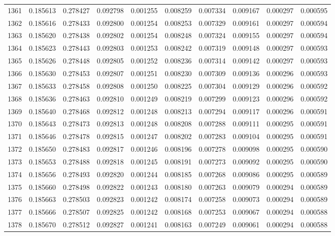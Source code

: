 \begin{tabular}{lrrrrrrrrr}
1361 & 0.185613 & 0.278427 & 0.092798 & 0.001255 & 0.008259 & 0.007334 & 0.009167 & 0.000297 & 0.000595 \\
1362 & 0.185616 & 0.278433 & 0.092800 & 0.001254 & 0.008253 & 0.007329 & 0.009161 & 0.000297 & 0.000594 \\
1363 & 0.185620 & 0.278438 & 0.092802 & 0.001254 & 0.008248 & 0.007324 & 0.009155 & 0.000297 & 0.000594 \\
1364 & 0.185623 & 0.278443 & 0.092803 & 0.001253 & 0.008242 & 0.007319 & 0.009148 & 0.000297 & 0.000593 \\
1365 & 0.185626 & 0.278448 & 0.092805 & 0.001252 & 0.008236 & 0.007314 & 0.009142 & 0.000297 & 0.000593 \\
1366 & 0.185630 & 0.278453 & 0.092807 & 0.001251 & 0.008230 & 0.007309 & 0.009136 & 0.000296 & 0.000593 \\
1367 & 0.185633 & 0.278458 & 0.092808 & 0.001250 & 0.008225 & 0.007304 & 0.009129 & 0.000296 & 0.000592 \\
1368 & 0.185636 & 0.278463 & 0.092810 & 0.001249 & 0.008219 & 0.007299 & 0.009123 & 0.000296 & 0.000592 \\
1369 & 0.185640 & 0.278468 & 0.092812 & 0.001248 & 0.008213 & 0.007294 & 0.009117 & 0.000296 & 0.000591 \\
1370 & 0.185643 & 0.278473 & 0.092813 & 0.001248 & 0.008208 & 0.007288 & 0.009111 & 0.000295 & 0.000591 \\
1371 & 0.185646 & 0.278478 & 0.092815 & 0.001247 & 0.008202 & 0.007283 & 0.009104 & 0.000295 & 0.000591 \\
1372 & 0.185650 & 0.278483 & 0.092817 & 0.001246 & 0.008196 & 0.007278 & 0.009098 & 0.000295 & 0.000590 \\
1373 & 0.185653 & 0.278488 & 0.092818 & 0.001245 & 0.008191 & 0.007273 & 0.009092 & 0.000295 & 0.000590 \\
1374 & 0.185656 & 0.278493 & 0.092820 & 0.001244 & 0.008185 & 0.007268 & 0.009086 & 0.000295 & 0.000589 \\
1375 & 0.185660 & 0.278498 & 0.092822 & 0.001243 & 0.008180 & 0.007263 & 0.009079 & 0.000294 & 0.000589 \\
1376 & 0.185663 & 0.278503 & 0.092823 & 0.001242 & 0.008174 & 0.007258 & 0.009073 & 0.000294 & 0.000589 \\
1377 & 0.185666 & 0.278507 & 0.092825 & 0.001242 & 0.008168 & 0.007253 & 0.009067 & 0.000294 & 0.000588 \\
1378 & 0.185670 & 0.278512 & 0.092827 & 0.001241 & 0.008163 & 0.007249 & 0.009061 & 0.000294 & 0.000588 \\

\end{tabular}
